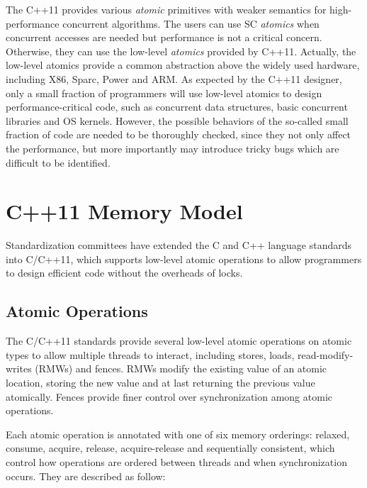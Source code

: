 \documentclass[preprint, numbers, 10pt]{sigplanconf}
\begin{document}
The C++11 provides various \textit{atomic} primitives 
with weaker semantics for high-performance
concurrent algorithms. The users can use SC \textit{atomics} 
when concurrent accesses are needed but performance is not a 
critical concern. Otherwise, they can use the low-level 
\textit{atomics} provided by C++11. Actually, the low-level 
atomics provide a common abstraction above the widely used 
hardware, including X86, Sparc, Power and ARM. As expected 
by the C++11 designer, only a small fraction of programmers 
will use low-level atomics to design performance-critical 
code, such as concurrent data structures, basic concurrent 
libraries and OS kernels. However, the possible behaviors of 
the so-called small fraction of code are needed to be 
thoroughly checked, since they not only affect the performance, 
but more importantly may introduce tricky bugs which are difficult
to be identified.


\section{C++11 Memory Model}

Standardization committees have extended the C and C++ language 
standards~\cite{ISO1, ISO2} into C/C++11, which supports low-level 
atomic operations to allow programmers to design efficient 
code without the overheads of locks. 

\subsection{Atomic Operations}
\label{sec:operations}

The C/C++11 standards provide several low-level atomic operations
on atomic types to allow multiple threads to interact, including
stores, loads, read-modify-writes (RMWs) and fences. RMWs modify
the existing value of an atomic location, storing the new value
and at last returning the previous value atomically. Fences provide
finer control over synchronization among atomic operations. 

Each atomic operation is annotated with one of six memory orderings: 
relaxed, consume, acquire, release, acquire-release and 
sequentially consistent, which control how operations are ordered
between threads and when synchronization occurs. They are described 
as follow: 
\end{document}
